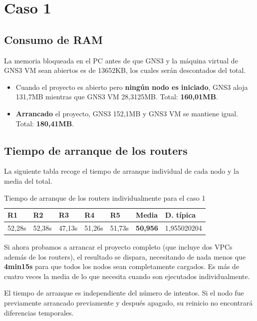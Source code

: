 \section{Caso 1}
\subsection{Consumo de RAM}
La memoria bloqueada en el PC antes de que GNS3 y la máquina virtual de GNS3 VM sean abiertos es de 13652KB, los cuales serán descontados del total.

\begin{itemize}
\item Cuando el proyecto es abierto pero \textbf{ningún nodo es iniciado}, GNS3 aloja 131,7MB mientras que GNS3 VM 28,3125MB. Total: \textbf{160,01MB}.
\item \textbf{Arrancado} el proyecto, GNS3 152,1MB y GNS3 VM se mantiene igual. Total: \textbf{180,41MB}.
\end{itemize}

\subsection{Tiempo de arranque de los routers}
La siguiente tabla recoge el tiempo de arranque individual de cada nodo y la media del total.

\begin{table}[H]
\centering
\begin{tabular}{|l|l|l|l|l|l|l|}
\hline
\textbf{R1} & \textbf{R2} 	& \textbf{R3} 	& \textbf{R4} 	& \textbf{R5} 	& \textbf{Media}	&	\textbf{D. típica}	\\ \hline
52,28s		& 52,38s		& 47,13s		& 51,26s		& 51,73s		& \textbf{50,956}	&	1,955020204			\\ \hline
\end{tabular}
\caption{Tiempo de arranque de los routers individualmente para el caso 1}
\label{tab:t1}
\end{table}

Si ahora probamos a arrancar el proyecto completo (que incluye dos VPCs además de los routers), el resultado se dispara, necesitando de nada menos que \textbf{4min15s} para que todos los nodos sean completamente cargados. Es más de cuatro veces la media de lo que necesita cuando son ejecutados individualmente.

El tiempo de arranque es independiente del número de intentos. Si el nodo fue previamente arrancado previamente y después apagado, su reinicio no encontrará diferencias temporales.

